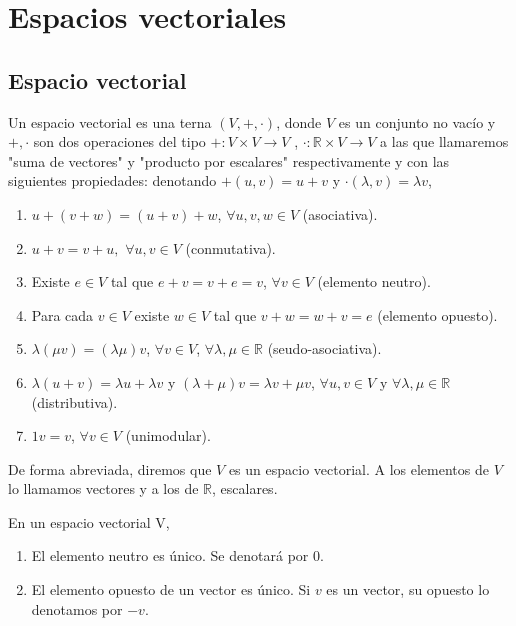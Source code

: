 \setlength{\parskip}{\baselineskip}%
\chapter{Espacios vectoriales}
	\section{Espacio vectorial}
		\begin{defi}
			Un espacio vectorial es una terna $ (V,+, \cdot) $, donde $ V $ es un conjunto no vacío y $+, \cdot$ son dos operaciones del tipo  $+:V\times V \to V$ , $\cdot:\mathbb{R}\times V  \to V$  a las que llamaremos "suma de vectores" y "producto 	por escalares" respectivamente y con las siguientes propiedades: denotando $ +(u, v) = u + v$  y  $\cdot  (\lambda, v) = \lambda v $,
		\end{defi}
		\begin{enumerate}
			\item $u + (v + w) = (u + v) + w$, $\forall u,v,w \in V$  (asociativa).
			\item $u + v = v + u, $ $\forall u,v \in V$ (conmutativa).
			\item Existe $e\in V$ tal que $e+v=v+e=v$, $ \forall v\in V$ (elemento neutro).
			\item Para cada $v\in V$ existe $w\in V$ tal que $v + w = w + v = e$ (elemento opuesto).
			\item $\lambda (\mu v)=(\lambda \mu)v$,  $\forall v\in V$, $\forall \lambda, \mu \in \mathbb{R}$ (seudo-asociativa).
			\item $\lambda (u+v)= \lambda u + \lambda v$ y $(\lambda + \mu )v= \lambda v + \mu v$, $\forall u,v \in V$  y  $\forall  \lambda, \mu \in \mathbb{R}$ (distributiva).
			\item $ 1v = v $, $\forall v \in V$ (unimodular).
		\end{enumerate}
		De forma abreviada, diremos que $V$ es un espacio vectorial. A los 	elementos de $V$
		lo llamamos vectores y a los de $\mathbb{R}$, escalares.\\[0.3cm]
		\begin{pro}
			En un espacio vectorial V,
		\begin{enumerate}
			\item El elemento neutro es único. Se denotará por 0.
			\item El elemento opuesto de un vector es único. Si $v$ es un vector, su opuesto lo denotamos por $-v$.
		\end{enumerate}
		\end{pro}
